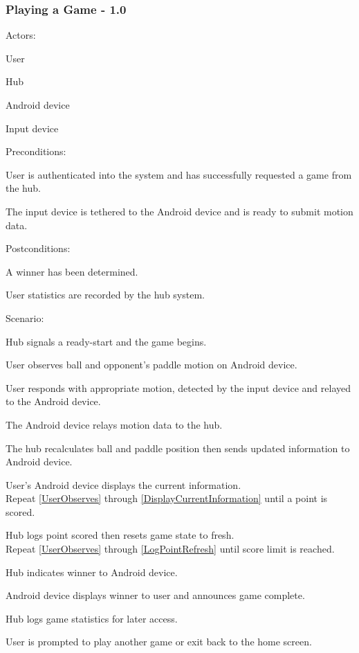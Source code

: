 \documentclass[12pt]{article}
\newenvironment{itemize*}%
  {\begin{itemize}%
  	\setlength{\parsep}{0pt}
    \setlength{\itemsep}{0pt}%
    \setlength{\parskip}{0pt}}%
  {\end{itemize}}
\newenvironment{enumerate*}%
  {\begin{enumerate}%
  	\setlength{\parsep}{0pt}
    \setlength{\itemsep}{0pt}%
    \setlength{\parskip}{0pt}}%
  {\end{enumerate}}
\begin{document}
\subsubsection*{Playing a Game - 1.0}
Actors:
\begin{itemize*}
\item User
\item Hub
\item Android device
\item Input device
\end{itemize*}
Preconditions:
\begin{itemize*}
\item User is authenticated into the system and has successfully requested a game from the hub.
\item The input device is tethered to the Android device and is ready to submit motion data.
\end{itemize*}
Postconditions:
\begin{itemize*}
\item A winner has been determined.
\item User statistics are recorded by the hub system.
\end{itemize*}
Scenario:
\begin{enumerate*}
\item Hub signals a ready-start and the game begins.
\item \label{UserObserves}User observes ball and opponent's paddle motion on Android device.
\item User responds with appropriate motion, detected by the input device and relayed to the Android device.
\item The Android device relays motion data to the hub.
\item \label{HubUpdateGame}The hub recalculates ball and paddle position then sends updated information to Android device.
\item \label{DisplayCurrentInformation}User's Android device displays the current information.\\
Repeat \ref{UserObserves} through \ref{DisplayCurrentInformation} until a point is scored.
\item \label{LogPointRefresh}Hub logs point scored then resets game state to fresh.\\
Repeat \ref{UserObserves} through \ref{LogPointRefresh} until score limit is reached.
\item \label{AnnounceWinner}Hub indicates winner to Android device.
\item Android device displays winner to user and announces game complete.
\item Hub logs game statistics for later access.
\item User is prompted to play another game or exit back to the home screen.
\end{enumerate*}
\end{document}
